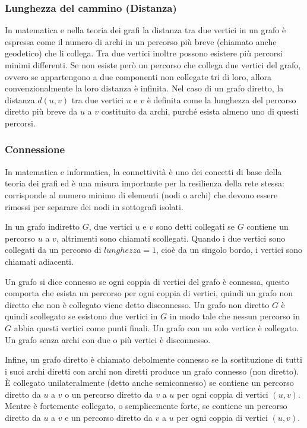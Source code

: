 \subsubsection{Lunghezza del cammino (Distanza)}
In matematica e nella teoria dei grafi la distanza tra due vertici in un grafo è espressa come il numero di archi in un percorso più breve (chiamato anche geodetico) che li collega. \cite{GrafoDistanza}
Tra due vertici inoltre possono esistere più percorsi minimi differenti. Se non esiste però un percorso che collega due vertici del grafo, ovvero se appartengono a due componenti non collegate tri di loro, allora convenzionalmente la loro distanza è infinita.
Nel caso di un grafo diretto, la distanza $d(u,v)$ tra due vertici $u$ e $v$ è definita come la lunghezza del percorso diretto più breve da $u$ a $v$ costituito da archi, purché esista almeno uno di questi percorsi.

\subsubsection{Connessione}
In matematica e informatica, la connettività è uno dei concetti di base della teoria dei grafi ed è una misura importante per la resilienza della rete stessa: 
corrisponde al numero minimo di elementi (nodi o archi) che devono essere rimossi per separare dei nodi in sottografi isolati. \cite{GrafoConnettivita}

In un grafo indiretto $G$, due vertici $u$ e $v$ sono detti collegati se $G$ contiene un percorso $u$ a $v$, altrimenti sono chiamati scollegati. Quando i due vertici sono collegati da un percorso di $lunghezza = 1$, cioè da un singolo bordo, i vertici sono chiamati adiacenti.

Un grafo si dice connesso se ogni coppia di vertici del grafo è connessa, questo comporta che esista un percorso per ogni coppia di vertici, quindi un grafo non diretto che non è collegato viene detto disconnesso. Un grafo non diretto $G$ è quindi scollegato se esistono due vertici in $G$ in modo tale che nessun percorso in $G$ abbia questi vertici come punti finali. Un grafo con un solo vertice è collegato. Un grafo senza archi con due o più vertici è disconnesso.

Infine, un grafo diretto è chiamato debolmente connesso se la sostituzione di tutti i suoi archi diretti con archi non diretti produce un grafo connesso (non diretto). È collegato unilateralmente (detto anche semiconnesso) se contiene un percorso diretto da $u$ a $v$ o un percorso diretto da $v$ a $u$ per ogni coppia di vertici $(u, v)$. Mentre è fortemente collegato, o semplicemente forte, se contiene un percorso diretto da $u$ a $v$ e un percorso diretto da $v$ a $u$ per ogni coppia di vertici $(u, v)$.

